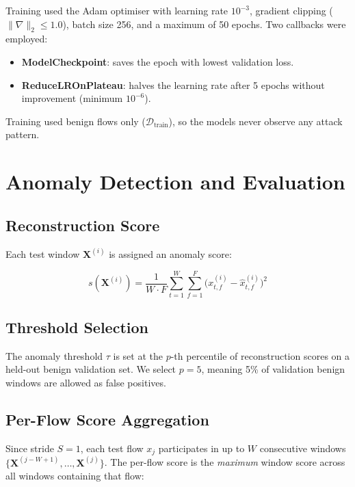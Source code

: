 \documentclass[conference]{IEEEtran}
\begin{document}
Training used the Adam optimiser with learning rate $10^{-3}$, gradient clipping
($\|\nabla\|_2 \le 1.0$), batch size 256, and a maximum of 50 epochs.
Two callbacks were employed:
\begin{itemize}
  \item \textbf{ModelCheckpoint}: saves the epoch with lowest validation loss.
  \item \textbf{ReduceLROnPlateau}: halves the learning rate after 5 epochs without
        improvement (minimum $10^{-6}$).
\end{itemize}

Training used benign flows only ($\mathcal{D}_\text{train}$), so the models
never observe any attack pattern.

\section{Anomaly Detection and Evaluation}

\subsection{Reconstruction Score}

Each test window $\mathbf{X}^{(i)}$ is assigned an anomaly score:

\begin{equation}
  s\!\left(\mathbf{X}^{(i)}\right) =
  \frac{1}{W \cdot F}\sum_{t=1}^{W}\sum_{f=1}^{F}
  \bigl(x_{t,f}^{(i)} - \hat{x}_{t,f}^{(i)}\bigr)^2
  \label{eq:score}
\end{equation}

\subsection{Threshold Selection}

The anomaly threshold $\tau$ is set at the $p$-th percentile of reconstruction scores on a
held-out benign validation set. We select $p=5$, meaning 5\% of validation benign windows
are allowed as false positives.

\subsection{Per-Flow Score Aggregation}

Since stride $S=1$, each test flow $x_j$ participates in up to $W$ consecutive windows
$\{\mathbf{X}^{(j-W+1)}, \ldots, \mathbf{X}^{(j)}\}$. The per-flow score is the
\emph{maximum} window score across all windows containing that flow:
\end{document}
